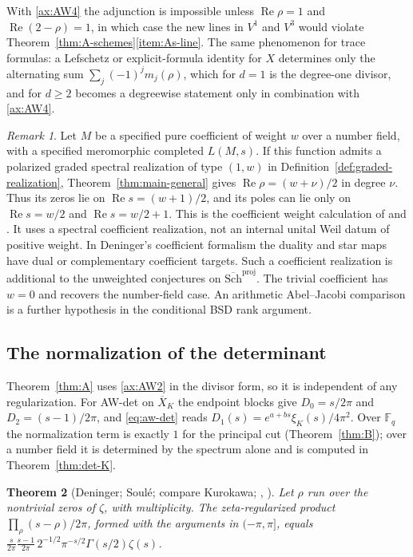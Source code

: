 \documentclass[11pt]{amsart}
\theoremstyle{plain}
\newtheorem{theorem}{Theorem}[section]
\theoremstyle{definition}
\theoremstyle{remark}
\newtheorem{remark}[theorem]{Remark}
\numberwithin{equation}{section}
\newcommand{\F}{\mathbb{F}}
\newcommand{\Xbar}{\overline{X}}
\newcommand{\Schbar}{\overline{\mathrm{Sch}}}
\DeclareMathOperator{\Rea}{Re}
\renewcommand{\Re}{\Rea}
\begin{document}
With \ref{ax:AW4} the adjunction is impossible unless $\Re\rho=1$ and
$\Re(2-\rho)=1$, in which case the new lines in $V^1$ and $V^3$ would
violate Theorem~\ref{thm:A-schemes}\ref{item:As-line}. The same
phenomenon for trace formulas: a Lefschetz or explicit-formula identity
for $X$ determines only the alternating sum $\sum_j(-1)^jm_j(\rho)$,
which for $d=1$ is the degree-one divisor, and for $d\ge2$ becomes a
degreewise statement only in combination with \ref{ax:AW4}.

\begin{remark}\label{rem:A-motivic}
Let $M$ be a specified pure coefficient of weight $w$ over a number
field, with a specified meromorphic completed $L(M,s)$.
If this function admits a polarized graded spectral realization
of type $(1,w)$ in Definition~\ref{def:graded-realization},
Theorem~\ref{thm:main-general} gives
$\Re\rho=(w+\nu)/2$ in degree $\nu$. Thus its zeros lie on
$\Re s=(w+1)/2$, and its poles can lie only on
$\Re s=w/2$ and $\Re s=w/2+1$.
This is the coefficient weight calculation of
\cite[(7.11)--(7.13), pp.~32--33]{Deninger1994Motivic} and
\cite[pp.~6--7]{Deninger2010HilbertPolya}.
It uses a spectral coefficient realization, not an internal
unital Weil datum of positive weight. In Deninger's coefficient
formalism the duality and star maps have dual or complementary
coefficient targets. Such a coefficient realization is additional
to the unweighted conjectures on $\Schbar^{\mathrm{proj}}$. The trivial
coefficient has $w=0$ and recovers the number-field case.
An arithmetic Abel--Jacobi comparison is a further hypothesis in
the conditional BSD rank argument.
\end{remark}

\subsection{The normalization of the determinant}
\label{subsec:det-normalization}

Theorem~\ref{thm:A} uses \ref{ax:AW2} in the divisor form, so it is
independent of any regularization. For AW-det on $\Xbar_K$ the endpoint
blocks give $D_0=s/2\pi$ and $D_2=(s-1)/2\pi$, and \eqref{eq:aw-det}
reads $D_1(s)=e^{a+bs}\xi_K(s)/4\pi^2$. Over $\F_q$ the normalization
term is exactly $1$ for the principal cut (Theorem~\ref{thm:B}); over a
number field it is determined by the spectrum alone and is computed in
Theorem~\ref{thm:det-K}.

\begin{theorem}[{Deninger; Soul\'e; compare Kurokawa;
\cite[Theorem~3.3, (3.3.1), p.~147]{Deninger1992Local},
\cite[pp.~164, 167, and p.~168]{Deninger1998Analogies}}]
\label{thm:imp-deninger-product}
Let $\rho$ run over the nontrivial zeros of $\zeta$, with multiplicity.
The zeta-regularized product $\prod_\rho(s-\rho)/2\pi$, formed with the
arguments in $(-\pi,\pi]$, equals
$\tfrac{s}{2\pi}\tfrac{s-1}{2\pi}\,2^{-1/2}\pi^{-s/2}\Gamma(s/2)
\zeta(s)$.
\end{theorem}
\end{document}
